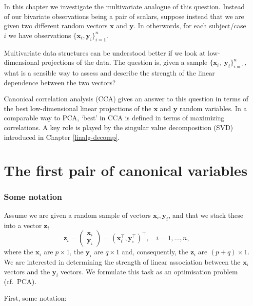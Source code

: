 \documentclass[
]{book}
\theoremstyle{definition}
\theoremstyle{definition}
\theoremstyle{definition}
\theoremstyle{definition}
\theoremstyle{remark}
\begin{document}
In this chapter we investigate the multivariate analogue of this question. Instead of our bivariate observations being a pair of scalars, suppose instead that we are given two different random vectors \(\mathbf x\) and \(\mathbf y\). In otherwords, for each subject/case \(i\) we have observations
\(\{\mathbf x_i,\mathbf y_i\}_{i=1}^n.\)

Multivariate data structures can be understood better if we look at low-dimensional projections of the data. The question is, given a sample \(\{\mathbf x_i, \; \mathbf y_i\}_{i=1}^{n}\), what is a sensible way to assess and describe the strength of the linear dependence between the two vectors?

Canonical correlation analysis (CCA) gives an answer to this question in terms of the best low-dimensional linear projections of the \(\mathbf x\) and \(\mathbf y\) random variables. In a comparable way to PCA, `best' in CCA is defined in terms of maximizing correlations.
A key role is played by the singular value decomposition (SVD) introduced in Chapter \ref{linalg-decomp}.

\section{The first pair of canonical variables}\label{cca1}

\subsubsection*{Some notation}\label{some-notation}

Assume we are given a random sample of vectors \(\mathbf x_i, \mathbf y_i\), and that we stack these into a vector \(\mathbf z_i\)
\[
\mathbf z_i=\left(\begin{array}{c}
\mathbf x_i\\
\mathbf y_i
\end{array}\right)=(\mathbf x_i^\top , \mathbf y_i^\top )^\top,\quad  i=1,\ldots, n,
\]
where
the \(\mathbf x_i\) are \(p \times 1\), the \(\mathbf y_i\) are \(q \times 1\) and, consequently, the \(\mathbf z_i\) are \((p+q)\times 1\). We are interested in determining the strength of linear association between the \(\mathbf x_i\) vectors and the \(\mathbf y_i\) vectors.
We formulate this task as an optimisation problem (cf.~PCA).

First, some notation:
\end{document}
